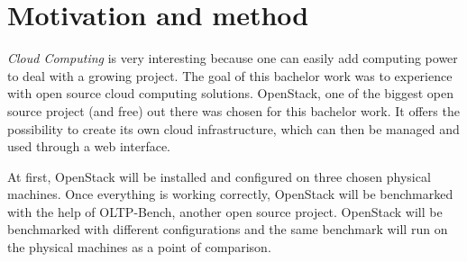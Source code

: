 \section{Motivation and method}
\textit{Cloud Computing} is very interesting because one can easily add computing power to deal with a growing project. 
The goal of this bachelor work was to experience with open source cloud computing solutions. 
OpenStack, one of the biggest open source project (and free) out there was chosen for this bachelor work. 
It offers the possibility to create its own cloud infrastructure, which can then be managed and used through a web interface.

At first, OpenStack will be installed and configured on three chosen physical machines. 
Once everything is working correctly, OpenStack will be benchmarked with the help of OLTP-Bench, another open source project. 
OpenStack will be benchmarked with different configurations and the same benchmark will run on the physical machines as a point of comparison.


